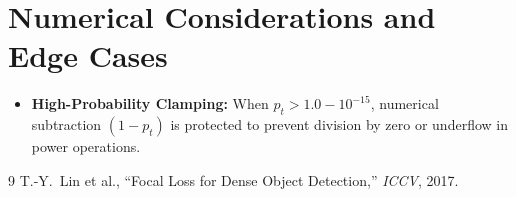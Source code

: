 \documentclass[11pt]{article}
\begin{document}
\section{Numerical Considerations and Edge Cases}
\label{sec:numerical}

\begin{itemize}
    \item \textbf{High-Probability Clamping:} When $p_t > 1.0 - 10^{-15}$, numerical subtraction $(1 - p_t)$ is protected to prevent division by zero or underflow in power operations.
\end{itemize}

\begin{thebibliography}{9}
 T.-Y.~Lin et al., ``Focal Loss for Dense Object Detection,'' \emph{ICCV}, 2017.
\end{thebibliography}
\end{document}
